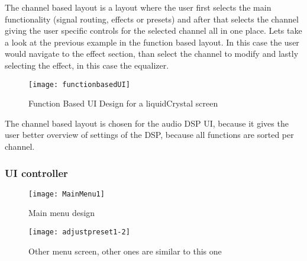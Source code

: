 The channel based layout is a layout where the user first selects the main functionality (signal routing, effects or presets) and after that selects the channel giving the user specific controls for the selected channel all in one place. Lets take a look at the previous example in the function based layout. In this case the user would navigate to the effect section, than select the channel to modify and lastly selecting the effect, in this case the equalizer.

\begin{figure}[ht]
    \texttt{[image: functionbasedUI]}
    \caption{Function Based UI Design for a liquidCrystal screen}
    \label{fig:functionbasedUI}
\end{figure}

The channel based layout is chosen for the audio DSP UI, because it gives the user better overview of settings of the DSP, because all functions are sorted per channel.

\subsubsection{UI controller}

\begin{figure}[ht]
    \texttt{[image: MainMenu1]}
    \caption{Main menu design}
    \label{fig:mainmenu}
\end{figure}

\begin{figure}[ht]
    \texttt{[image: adjustpreset1-2]}
    \caption{Other menu screen, other ones are similar to this one}
    \label{fig:adjustpresetmenu}
\end{figure}


